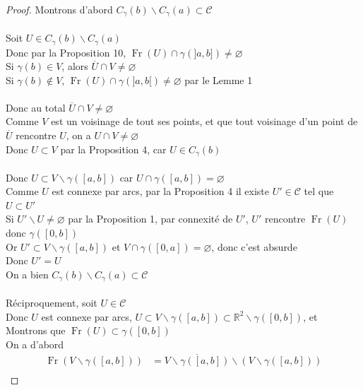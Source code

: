 \documentclass{article}
\begin{document}
\begin{flushleft}
\begin{proof}
    Montrons d'abord $C_{\gamma}(b) \backslash C_{\gamma}(a) \subset \mathcal{C}$
    \\~\\
    Soit $U \in C_{\gamma}(b) \backslash C_{\gamma}(a)$\\
    Donc par la Proposition 10, $\operatorname{Fr}(U) \cap \gamma(]a, b]) \neq \varnothing$\\
    Si $\gamma(b) \in V$, alors $\overline{U} \cap V \neq \varnothing$\\
    Si $\gamma(b) \notin V$, $\operatorname{Fr}(U) \cap \gamma(]a, b[) \neq \varnothing$ par le Lemme 1
    \\~\\
    Donc au total $\overline{U} \cap V \neq \varnothing$\\
    Comme $V$ est un voisinage de tout ses points, et que tout voisinage d'un point de $\overline{U}$ rencontre $U$, on a
    $U \cap V \neq \varnothing$\\
    Donc $U \subset V$ par la Proposition 4, car $U \in C_{\gamma}(b)$
    \\~\\
    Donc $U \subset V \backslash \gamma([a, b])$ car $U \cap \gamma([a, b]) = \varnothing$\\
    Comme $U$ est connexe par arcs, par la Proposition 4 il existe $U' \in \mathcal{C}$ tel que $U \subset U'$\\
    Si $U' \backslash U \neq \varnothing$ par la Proposition 1, par connexité de $U'$, $U'$ rencontre $\operatorname{Fr}(U)$ donc
    $\gamma([0, b])$\\
    Or $U' \subset V \backslash \gamma([a, b])$ et $V \cap \gamma([0, a]) = \varnothing$, donc c'est absurde\\
    Donc $U' = U$\\
    On a bien $C_{\gamma}(b) \backslash C_{\gamma}(a) \subset \mathcal{C}$
    \\~\\
    Réciproquement, soit $U \in \mathcal{C}$\\
    Donc $U$ est connexe par arcs, $U \subset V \backslash \gamma([a, b]) \subset \mathbb{R}^2 \backslash \gamma([0, b])$, et
    Montrons que $\operatorname{Fr}(U) \subset \gamma([0, b])$\\
    On a d'abord
    \begin{align*}
        \operatorname{Fr}(V \backslash \gamma([a, b])) &= \overline{V \backslash \gamma([a, b])} \backslash (V \backslash \gamma([a, b]))\\

\end{align*}
\end{proof}
\end{flushleft}
\end{document}
